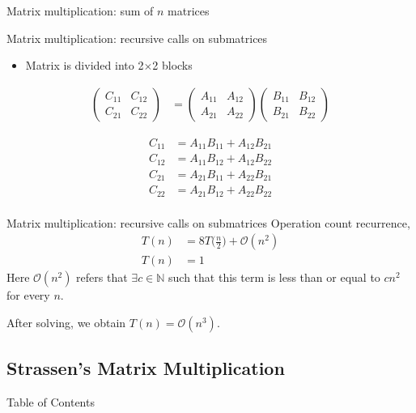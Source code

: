 \documentclass[
11pt, %
]{beamer}
\begin{document}
\begin{frame}{Matrix multiplication: sum of $n$ matrices}
	
\end{frame}


\begin{frame}{Matrix multiplication: recursive calls on submatrices}
	\begin{itemize}
		\item Matrix is divided into 2$\times$2 blocks
	\end{itemize}
	
	\begin{align*}
	\begin{pmatrix}
	C_{11} & C_{12} \\
	C_{21} & C_{22}
	\end{pmatrix}
	&
	=
	\begin{pmatrix}
	A_{11} & A_{12} \\
	A_{21} & A_{22}
	\end{pmatrix}
	\begin{pmatrix}
	B_{11} & B_{12} \\
	B_{21} & B_{22}
	\end{pmatrix}
	\end{align*}
	
	\begin{align*}
	C_{11} &= A_{11}B_{11} + A_{12}B_{21}\\
	C_{12} &= A_{11}B_{12} + A_{12}B_{22}\\
	C_{21} &= A_{21}B_{11} + A_{22}B_{21}\\
	C_{22} &= A_{21}B_{12} + A_{22}B_{22}\\
	\end{align*}
\end{frame}


\begin{frame}{Matrix multiplication: recursive calls on submatrices}
	Operation count recurrence,
	\begin{align*}
	T(n) &= 8T\Big(\frac{n}{2}\Big) + \mathcal{O}(n^2)\\
	T(n) &= 1
	\end{align*}
	Here $\mathcal{O}(n^2)$ refers that $\exists c\in\mathbb{N}$ such that this term is less than or equal to $cn^2$ for every $n$.
	\medskip
	
	
	After solving, we obtain $T(n) = \mathcal{O}(n^3)$.
\end{frame}


\subsection{Strassen's Matrix Multiplication}
	\begin{frame}{Table of Contents}		
	\end{frame}
\end{document}
